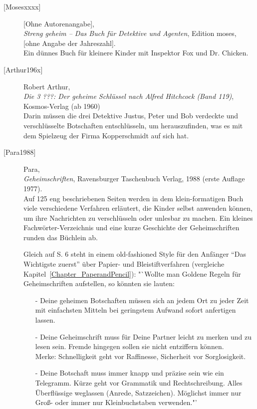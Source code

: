 \begin{description}

\item[\textrm{[Mosesxxxx]}] 
    [Ohne Autorenangabe], \\
    {\em Streng geheim -- Das Buch für Detektive und Agenten},
    Edition moses, [ohne Angabe der Jahreszahl]. \\
    Ein dünnes Buch für kleinere Kinder mit Inspektor Fox und Dr. Chicken.\\


\item[\textrm{[Arthur196x]}] 
    Robert Arthur, \\
    {\em Die 3 ???: Der geheime Schlüssel nach Alfred Hitchcock (Band 119)},
    Kosmos-Verlag (ab 1960) \\
    Darin müssen die drei Detektive Justus, Peter und Bob verdeckte und
    verschlüsselte Botschaften entschlüsseln, um herauszufinden, was
    es mit dem Spielzeug der Firma Kopperschmidt auf sich hat.\\


\item[\textrm{[Para1988]}] 
    Para, \\
    {\em Geheimschriften},
    Ravensburger Taschenbuch Verlag, 1988 (erste Auflage 1977). \\
    Auf 125 eng beschriebenen Seiten werden in dem klein-formatigen
    Buch viele verschiedene Verfahren erläutert, die Kinder selbst
    anwenden können, um ihre Nachrichten zu verschlüsseln oder unlesbar
    zu machen. Ein kleines Fachwörter-Verzeichnis und eine kurze
    Geschichte der Geheimschriften runden das Büchlein ab.

    Gleich auf S. 6 steht in einem old-fashioned Style für den Anfänger
    "`Das Wichtigste zuerst"' über Papier- und Bleistiftverfahren
    (vergleiche Kapitel~\ref{Chapter_PaperandPencil}):
    "`Wollte man Goldene Regeln für Geheimschriften aufstellen, so
    könnten sie lauten:
    \begin{itemize}
      \item[-] Deine geheimen Botschaften müssen sich an jedem Ort zu
               jeder Zeit mit einfachsten Mitteln bei geringstem Aufwand
               sofort anfertigen lassen.
      \item[-] Deine Geheimschrift muss für Deine Partner leicht zu merken
               und zu lesen sein. Fremde hingegen sollen sie nicht entziffern
               können.\\
               Merke: Schnelligkeit geht vor Raffinesse, Sicherheit vor
               Sorglosigkeit.
      \item[-] Deine Botschaft muss immer knapp und präzise sein wie
               ein Telegramm.
               Kürze geht vor Grammatik und Rechtschreibung. Alles
               Überflüssige weglassen (Anrede, Satzzeichen).
               Möglichst immer nur Groß- oder immer nur
               Kleinbuchstaben verwenden."'
    \end{itemize}



\end{description}
